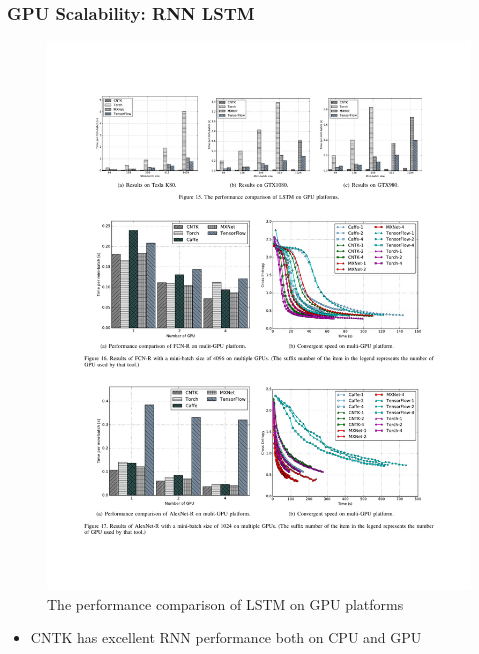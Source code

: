 \begin{frame}
	\MyLogo
	\frametitle{GPU Scalability: RNN LSTM}
	
	\begin{figure}[htbp] 
		\includegraphics[width=\linewidth]{figures/LSTM2.pdf} 
		\caption{The performance comparison of LSTM on GPU platforms}
	\end{figure}

\vskip -10pt
\begin{mdframed}[style=mystyle1]
\begin{itemize}
\item CNTK has excellent RNN performance both on CPU and GPU
\end{itemize}
\end{mdframed}
	
\end{frame}


